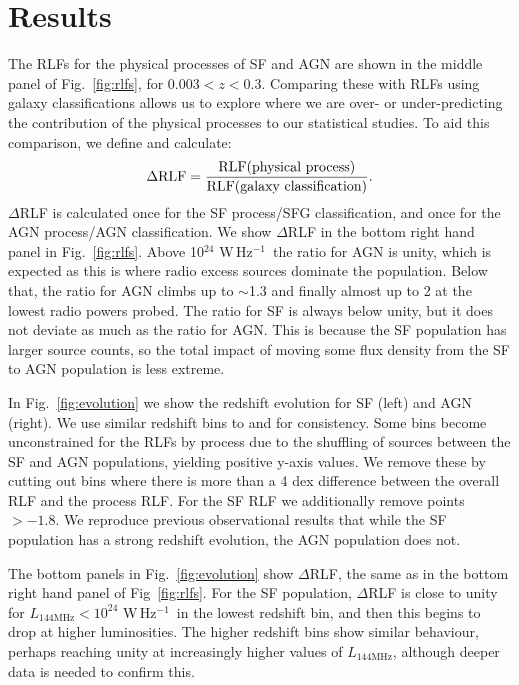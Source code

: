 \documentclass[usenatbib,fleqn,letters]{mnras}
\newcommand{\wphz}{$\,$W$\,$Hz$^{-1}$}
\begin{document}
\section{Results}
\label{sec:results}
The RLFs for the physical processes of SF and AGN are shown in the middle panel of Fig.~\ref{fig:rlfs}, for  $0.003 < z < 0.3$. 
Comparing these with RLFs using galaxy classifications allows us to explore where we are over- or under-predicting the contribution of the physical processes to our statistical studies. To aid this comparison, we define and calculate: 
\begin{equation}
\Delta\textrm{RLF} = \frac{\textrm{RLF(physical process)}}{\textrm{RLF(galaxy classification)}}. \notag
\end{equation}
$\Delta$RLF is calculated once for the SF process/SFG classification, and once for the AGN process/AGN classification. We show $\Delta$RLF in the bottom right hand panel in Fig.~\ref{fig:rlfs}. Above 10$^{24}\,$\wphz\ the ratio for AGN is unity, which is expected as this is where radio excess sources dominate the population. Below that, the ratio for AGN climbs up to $\sim$1.3 and finally almost up to 2 at the lowest radio powers probed. The ratio for SF is always below unity, but it does not deviate as much as the ratio for AGN. This is because the SF population has larger source counts, so the total impact of moving some flux density from the SF to AGN population is less extreme. 

In Fig.~\ref{fig:evolution} we show the redshift evolution for SF (left) and AGN (right).  We use similar redshift bins to \cite{kondapally_cosmic_2022} and \cite{cochrane_lofar_2023} for consistency. Some bins become unconstrained for the RLFs by process due to the shuffling of sources between the SF and AGN populations, yielding positive y-axis values. We remove these by cutting out bins where there is more than a 4 dex difference between the overall RLF and the process RLF. For the SF RLF we additionally remove points $>-1.8$. We reproduce previous observational results that while the SF population has a strong redshift evolution, the AGN population does not. 

The bottom panels in Fig.~\ref{fig:evolution} show $\Delta$RLF, the same as in the bottom right hand panel of Fig~\ref{fig:rlfs}. For the SF population, $\Delta$RLF is close to unity for $L_{\textrm{144MHz}} < 10^{24}\,$\wphz\ in the lowest redshift bin, and then this begins to drop at higher luminosities. The higher redshift bins show similar behaviour, perhaps reaching unity at increasingly higher values of $L_{\textrm{144MHz}}$, although deeper data is needed to confirm this. 
\end{document}
